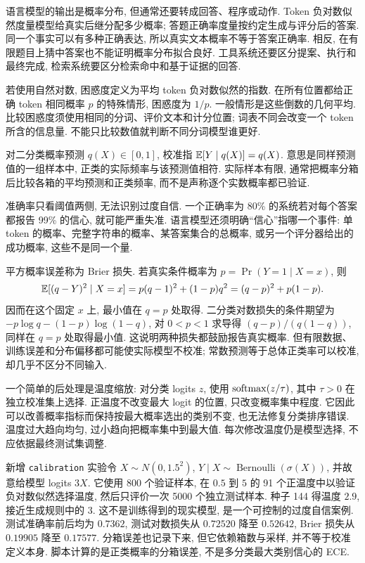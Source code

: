 语言模型的输出是概率分布, 但通常还要转成回答、程序或动作. Token 负对数似然度量模型给真实后继分配多少概率; 答题正确率度量按约定生成与评分后的答案. 同一个事实可以有多种正确表达, 所以真实文本概率不等于答案正确率. 相反, 在有限题目上猜中答案也不能证明概率分布拟合良好. 工具系统还要区分提案、执行和最终完成, 检索系统要区分检索命中和基于证据的回答.

若使用自然对数, 困惑度定义为平均 token 负对数似然的指数. 在所有位置都给正确 token 相同概率 $p$ 的特殊情形, 困惑度为 $1/p$. 一般情形是这些倒数的几何平均. 比较困惑度须使用相同的分词、评价文本和计分位置; 词表不同会改变一个 token 所含的信息量. 不能只比较数值就判断不同分词模型谁更好.

\begin{definition}
对二分类概率预测 $q(X)\in[0,1]$, 校准指 $\mathbb E[Y\mid q(X)]=q(X)$. 意思是同样预测值的一组样本中, 正类的实际频率与该预测值相符. 实际样本有限, 通常把概率分箱后比较各箱的平均预测和正类频率, 而不是声称逐个实数概率都已验证.
\end{definition}
准确率只看阈值两侧, 无法识别过度自信. 一个正确率为 80\% 的系统若对每个答案都报告 99\% 的信心, 就可能严重失准. 语言模型还须明确“信心”指哪一个事件: 单 token 的概率、完整字符串的概率、某答案集合的总概率, 或另一个评分器给出的成功概率, 这些不是同一个量.

平方概率误差称为 Brier 损失. 若真实条件概率为 $p=\Pr(Y=1\mid X=x)$, 则
\[
\mathbb E[(q-Y)^2\mid X=x]=p(q-1)^2+(1-p)q^2
=(q-p)^2+p(1-p).
\]
因而在这个固定 $x$ 上, 最小值在 $q=p$ 处取得. 二分类对数损失的条件期望为 $-p\log q-(1-p)\log(1-q)$, 对 $0<p<1$ 求导得 $(q-p)/(q(1-q))$, 同样在 $q=p$ 处取得最小值. 这说明两种损失都鼓励报告真实概率. 但有限数据、训练误差和分布偏移都可能使实际模型不校准; 常数预测等于总体正类率可以校准, 却几乎不区分不同输入.

一个简单的后处理是温度缩放: 对分类 logits $z$, 使用 $\operatorname{softmax}(z/\tau)$, 其中 $\tau>0$ 在独立校准集上选择\cite{calibration}. 正温度不改变最大 logit 的位置, 只改变概率集中程度. 它因此可以改善概率指标而保持按最大概率选出的类别不变, 也无法修复分类排序错误. 温度过大趋向均匀, 过小趋向把概率集中到最大值. 每次修改温度仍是模型选择, 不应依据最终测试集调整.

新增 \texttt{calibration} 实验令 $X\sim N(0,1.5^2)$, $Y\mid X\sim\operatorname{Bernoulli}(\sigma(X))$, 并故意给模型 logits $3X$. 它使用 800 个验证样本, 在 $0.5$ 到 $5$ 的 91 个正温度中以验证负对数似然选择温度, 然后只评价一次 5000 个独立测试样本. 种子 144 得温度 $2.9$, 接近生成规则中的 3. 这不是训练得到的现实模型, 是一个可控制的过度自信案例. 测试准确率前后均为 $0.7362$, 测试对数损失从 $0.72520$ 降至 $0.52642$, Brier 损失从 $0.19905$ 降至 $0.17577$. 分箱误差也记录下来, 但它依赖箱数与采样, 并不等于校准定义本身. 脚本计算的是正类概率的分箱误差, 不是多分类最大类别信心的 ECE.

